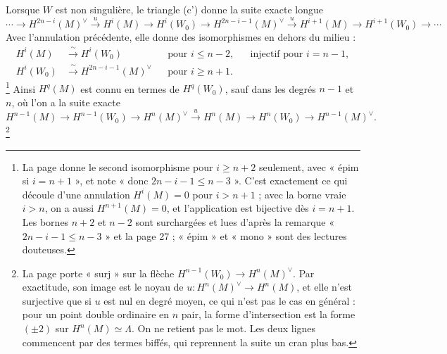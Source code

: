 \documentclass[11pt,a4paper]{article}
\begin{document}
Lorsque $W$ est non singulière, le triangle (c') donne la suite exacte longue
\[
  \cdots \to H^{2n-i}(M)^{\vee} \xrightarrow{\ u\ } H^{i}(M) \to H^{i}(W_0)
  \to H^{2n-i-1}(M)^{\vee} \xrightarrow{\ u\ } H^{i+1}(M) \to H^{i+1}(W_0) \to \cdots
\]
Avec l'annulation précédente, elle donne des isomorphismes en dehors du milieu :
\[
  \begin{aligned}
    H^{i}(M) &\xrightarrow{\ \sim\ } H^{i}(W_0) && \text{pour } i \leq n-2,
      && \text{injectif pour } i = n-1, \\
    H^{i}(W_0) &\xrightarrow{\ \sim\ } H^{2n-i-1}(M)^{\vee} && \text{pour } i \geq n+1 .
  \end{aligned}
\]
\footnote{La page donne le second isomorphisme pour $i \geq n+2$ seulement, avec
« épim si $i = n+1$ », et note « donc $2n-i-1 \leq n-3$ ». C'est exactement ce
qui découle d'une annulation $H^{i}(M) = 0$ pour $i > n+1$ ; avec la borne
vraie $i > n$, on a aussi $H^{n+1}(M) = 0$, et l'application est bijective dès
$i = n+1$. Les bornes $n+2$ et $n-2$ sont surchargées et lues d'après la
remarque « $2n-i-1 \leq n-3$ » et la page 27 ; « épim » et « mono » sont des
lectures douteuses.} Ainsi $H^{q}(M)$ est connu en termes de $H^{q}(W_0)$, sauf
dans les degrés $n-1$ et $n$, où l'on a la suite exacte
\[
  H^{n-1}(M) \to H^{n-1}(W_0) \to H^{n}(M)^{\vee} \xrightarrow{\ u\ } H^{n}(M)
  \to H^{n}(W_0) \to H^{n-1}(M)^{\vee} .
\]
\footnote{La page porte « surj » sur la flèche $H^{n-1}(W_0) \to
H^{n}(M)^{\vee}$. Par exactitude, son image est le noyau de
$u : H^{n}(M)^{\vee} \to H^{n}(M)$, et elle n'est surjective que si $u$ est nul
en degré moyen, ce qui n'est pas le cas en général : pour un point double
ordinaire en $n$ pair, la forme d'intersection est la forme $(\pm 2)$ sur
$H^{n}(M) \simeq \Lambda$. On ne retient pas le mot. Les deux lignes commencent
par des termes biffés, qui reprennent la suite un cran plus bas.}
\end{document}
